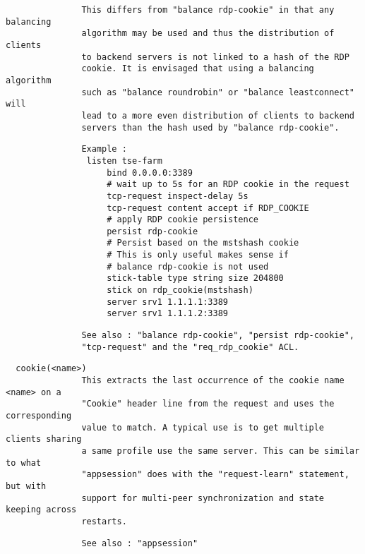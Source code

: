 \begin{verbatim}
               This differs from "balance rdp-cookie" in that any balancing
               algorithm may be used and thus the distribution of clients
               to backend servers is not linked to a hash of the RDP
               cookie. It is envisaged that using a balancing algorithm
               such as "balance roundrobin" or "balance leastconnect" will
               lead to a more even distribution of clients to backend
               servers than the hash used by "balance rdp-cookie".
\end{verbatim}

\begin{verbatim}
               Example :
                listen tse-farm
                    bind 0.0.0.0:3389
                    # wait up to 5s for an RDP cookie in the request
                    tcp-request inspect-delay 5s
                    tcp-request content accept if RDP_COOKIE
                    # apply RDP cookie persistence
                    persist rdp-cookie
                    # Persist based on the mstshash cookie
                    # This is only useful makes sense if
                    # balance rdp-cookie is not used
                    stick-table type string size 204800
                    stick on rdp_cookie(mstshash)
                    server srv1 1.1.1.1:3389
                    server srv1 1.1.1.2:3389
\end{verbatim}

\begin{verbatim}
               See also : "balance rdp-cookie", "persist rdp-cookie",
               "tcp-request" and the "req_rdp_cookie" ACL.
\end{verbatim}

\begin{verbatim}
  cookie(<name>)
               This extracts the last occurrence of the cookie name <name> on a
               "Cookie" header line from the request and uses the corresponding
               value to match. A typical use is to get multiple clients sharing
               a same profile use the same server. This can be similar to what
               "appsession" does with the "request-learn" statement, but with
               support for multi-peer synchronization and state keeping across
               restarts.
\end{verbatim}

\begin{verbatim}
               See also : "appsession"
\end{verbatim}

